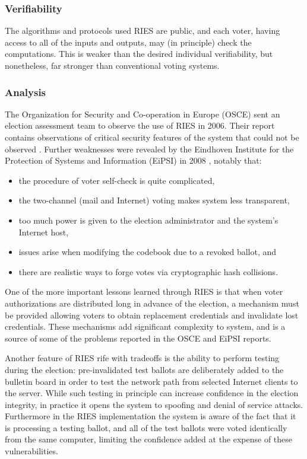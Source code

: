 \subsubsection{Verifiability}

The algorithms and protocols used RIES are public, and each voter,
having access to all of the inputs and outputs, may (in principle)
check the computations. This is weaker than the desired individual
verifiability, but nonetheless, far stronger than
conventional voting systems.

\subsubsection{Analysis}

The Organization for Security and Co-operation in Europe (OSCE) sent
an election assessment team to observe the use of RIES in 2006. Their
report contains observations of critical security features of the
system that could not be observed \cite{osce2007}. Further
weaknesses were revealed by the Eindhoven Institute for the Protection
of Systems and Information (EiPSI) in 2008 \cite{hubbers2008},
notably that:

\begin{itemize}
  \item the procedure of voter self-check is quite complicated,
  \item the two-channel (mail and Internet) voting makes system less
    transparent,
  \item too much power is given to the election administrator and the
    system's Internet host,
  \item issues arise when modifying the codebook due to a revoked
    ballot, and
  \item there are realistic ways to forge votes via cryptographic hash
    collisions.
\end{itemize}

One of the more important lessons learned through RIES is that when
voter authorizations are distributed long in advance of the election,
a mechanism must be provided allowing voters to obtain replacement
credentials and invalidate lost credentials. These mechanisms add
significant complexity to system, and is a source of some of the
problems reported in the OSCE and EiPSI reports.

Another feature of RIES rife with tradeoffs is the ability to perform
testing during the election: pre-invalidated test ballots are
deliberately added to the bulletin board in order to test the network
path from selected Internet clients to the server. While such testing
in principle can increase confidence in the election integrity, in
practice it opens the system to spoofing and denial of service
attacks. Furthermore in the RIES implementation the system is aware of
the fact that it is processing a testing ballot, and all of the test
ballots were voted identically from the same computer, limiting the
confidence added at the expense of these vulnerabilities.

